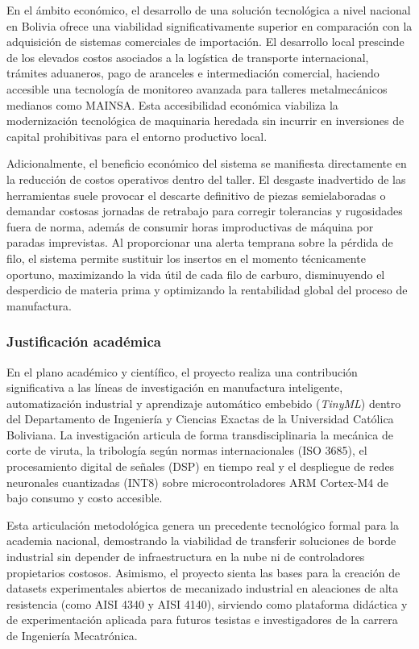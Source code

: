 En el ámbito económico, el desarrollo de una solución tecnológica a nivel nacional en Bolivia ofrece una viabilidad significativamente superior en comparación con la adquisición de sistemas comerciales de importación. El desarrollo local prescinde de los elevados costos asociados a la logística de transporte internacional, trámites aduaneros, pago de aranceles e intermediación comercial, haciendo accesible una tecnología de monitoreo avanzada para talleres metalmecánicos medianos como MAINSA. Esta accesibilidad económica viabiliza la modernización tecnológica de maquinaria heredada sin incurrir en inversiones de capital prohibitivas para el entorno productivo local.

Adicionalmente, el beneficio económico del sistema se manifiesta directamente en la reducción de costos operativos dentro del taller. El desgaste inadvertido de las herramientas suele provocar el descarte definitivo de piezas semielaboradas o demandar costosas jornadas de retrabajo para corregir tolerancias y rugosidades fuera de norma, además de consumir horas improductivas de máquina por paradas imprevistas. Al proporcionar una alerta temprana sobre la pérdida de filo, el sistema permite sustituir los insertos en el momento técnicamente oportuno, maximizando la vida útil de cada filo de carburo, disminuyendo el desperdicio de materia prima y optimizando la rentabilidad global del proceso de manufactura.

\subsubsection{Justificación académica}
\label{subsubsec:justificacion_academica}

En el plano académico y científico, el proyecto realiza una contribución significativa a las líneas de investigación en manufactura inteligente, automatización industrial y aprendizaje automático embebido (\textit{TinyML}) dentro del Departamento de Ingeniería y Ciencias Exactas de la Universidad Católica Boliviana. La investigación articula de forma transdisciplinaria la mecánica de corte de viruta, la tribología según normas internacionales (ISO 3685), el procesamiento digital de señales (DSP) en tiempo real y el despliegue de redes neuronales cuantizadas (INT8) sobre microcontroladores ARM Cortex-M4 de bajo consumo y costo accesible.

Esta articulación metodológica genera un precedente tecnológico formal para la academia nacional, demostrando la viabilidad de transferir soluciones de borde industrial sin depender de infraestructura en la nube ni de controladores propietarios costosos. Asimismo, el proyecto sienta las bases para la creación de datasets experimentales abiertos de mecanizado industrial en aleaciones de alta resistencia (como AISI 4340 y AISI 4140), sirviendo como plataforma didáctica y de experimentación aplicada para futuros tesistas e investigadores de la carrera de Ingeniería Mecatrónica.

